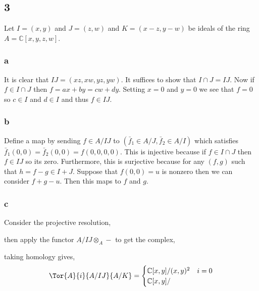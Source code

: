 \documentclass[12pt]{article}
\renewcommand{\C}{\mathbb{C}}
\begin{document}
\subsection{3}

Let $I = (x,y)$ and $J = (z,w)$ and $K = (x-z, y-w)$ be ideals of the ring $A = \C[x,y,z,w]$.

\subsubsection{a}

It is clear that $IJ = (xz, xw, yz, yw)$. It suffices to show that $I \cap J = IJ$. Now if $f \in I \cap J$ then $f = a x + by = c w + d y$. Setting $x = 0$ and $y = 0$ we see that $f = 0$ so $c \in I$ and $d \in I$ and thus $f \in IJ$.

\subsubsection{b}

Define a map by sending $f \in A / IJ$ to $(\bar{f}_1 \in A / J, \bar{f}_2 \in A / I)$ which satisfies $\bar{f}_1(0,0) = \bar{f}_2(0,0) = f(0,0,0,0)$. This is injective because if $f \in I \cap J$ then $f \in IJ$ so its zero. Furthermore, this is surjective because for any $(f,g)$ such that $h = f - g \in I + J$. Suppose that $f(0,0) = u$ is nonzero then we can consider $f + g - u$. Then this maps to $f$ and $g$. 

\subsubsection{c}

Consider the projective resolution,
\begin{center}
\end{center} 
then apply the functor $A / IJ \otimes_A - $ to get the complex,
\begin{center}
\end{center}
taking homology gives,
\[ \Tor{A}{i}{A/IJ}{A/K} = 
\begin{cases}
\C[x,y]/(x,y)^2 & i = 0
\\
\C[x,y]/
\end{cases} \]
\end{document}
